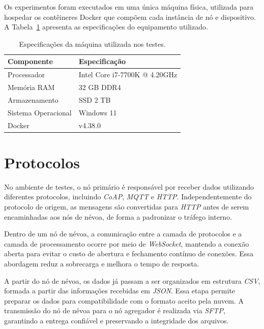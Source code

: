 Os experimentos foram executados em uma única máquina física, utilizada para hospedar os contêineres Docker que compõem cada instância de nó e dispositivo. A Tabela~\ref{tab:especificacoes_maquina} apresenta as especificações do equipamento utilizado.

\begin{table}[htb]
    \caption{\label{tab:especificacoes_maquina}Especificações da máquina utilizada nos testes.}
    \centering
    \begin{tabular}{ll}
        \hline
            \textbf{Componente} & \textbf{Especificação} \\
        \hline
            Processador & Intel Core i7-7700K @ 4.20GHz \\
            Memória RAM & 32 GB DDR4 \\
            Armazenamento & SSD 2 TB \\
            Sistema Operacional & Windows 11 \\
            Docker & v4.38.0 \\
        \hline
    \end{tabular}
\end{table}

\section{Protocolos}

No ambiente de testes, o nó primário é responsável por receber dados utilizando diferentes protocolos, incluindo \textit{CoAP}, \textit{MQTT} e \textit{HTTP}. Independentemente do protocolo de origem, as mensagens são convertidas para \textit{HTTP} antes de serem encaminhadas aos nós de névoa, de forma a padronizar o tráfego interno.

Dentro de um nó de névoa, a comunicação entre a camada de protocolos e a camada de processamento ocorre por meio de \textit{WebSocket}, mantendo a conexão aberta para evitar o custo de abertura e fechamento contínuo de conexões. Essa abordagem reduz a sobrecarga e melhora o tempo de resposta.

A partir do nó de névoa, os dados já passam a ser organizados em estrutura \textit{CSV}, formada a partir das informações recebidas em \textit{JSON}. Essa etapa permite preparar os dados para compatibilidade com o formato aceito pela nuvem. A transmissão do nó de névoa para o nó agregador é realizada via \textit{SFTP}, garantindo a entrega confiável e preservando a integridade dos arquivos.

